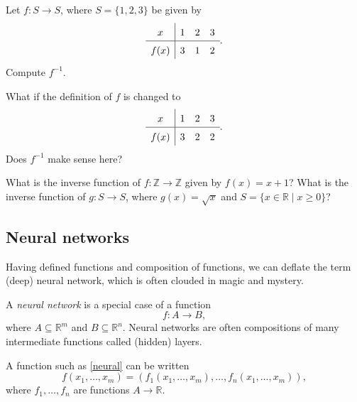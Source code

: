 \begin{exercise}
  Let $f: S\rightarrow S$, where $S = \{1, 2, 3\}$ be given by
  $$
    \def\arraystretch{1.5}
    \begin{array}{c|ccccccc}
      x    & 1 & 2 & 3 \\ \hline
      f(x) & 3 & 1 & 2
    \end{array}.
  $$
  Compute $f^{-1}$.

  What if the definition of $f$ is changed to
  $$
    \def\arraystretch{1.5}
    \begin{array}{c|ccccccc}
      x    & 1 & 2 & 3 \\ \hline
      f(x) & 3 & 2 & 2
    \end{array}.
  $$
  Does $f^{-1}$ make sense here?
\end{exercise}

\begin{exercise}
  What is the inverse function of $f:\mathbb{Z}\rightarrow \mathbb{Z}$ given by $f(x) = x + 1$?
  What is the inverse function of $g: S \rightarrow S$, where $g(x) = \sqrt{x}$ and
  $S = \{x\in \mathbb{R}\mid x\geq 0\}$?
\end{exercise}

\subsection{Neural networks}

Having defined functions and composition of functions, we can deflate
the term (deep) neural network, which is often clouded in
magic and mystery.

A \emph{neural network} is a special case of a function
\begin{equation}\label{neural}
  f: A\rightarrow B,
\end{equation}
where $A\subseteq \mathbb{R}^m$ and $B\subseteq \mathbb{R}^n$. Neural networks are
often compositions of many intermediate functions called
(hidden) layers.

\begin{tcolorbox}
  A function such as \eqref{neural} can
  be written
  \begin{equation}\label{equation.1.8.17}
    f(x_1, \dots, x_m) = \left(
    f_1(x_1, \dots, x_m), \dots, f_n(x_1, \dots, x_m)\right),
  \end{equation}
  where $f_1, \dots, f_n$ are functions $A\rightarrow \mathbb{R}$.
\end{tcolorbox}

